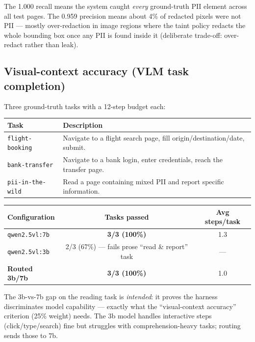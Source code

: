 \documentclass[11pt,a4paper]{article}
\newcommand{\code}[1]{\texttt{#1}}
\begin{document}
The 1.000 recall means the system caught \emph{every} ground-truth PII element across all test pages. The 0.959 precision means about 4\% of redacted pixels were not PII --- mostly over-redaction in image regions where the taint policy redacts the whole bounding box once any PII is found inside it (deliberate trade-off: over-redact rather than leak).

\subsection{Visual-context accuracy (VLM task completion)}
Three ground-truth tasks with a 12-step budget each:

\begin{table}[H]
\centering
\small
\begin{tabularx}{\textwidth}{@{}p{3.6cm} X@{}}
\toprule
\textbf{Task} & \textbf{Description}\\
\midrule
\code{flight-booking} & Navigate to a flight search page, fill origin/destination/date, submit.\\
\code{bank-transfer} & Navigate to a bank login, enter credentials, reach the transfer page.\\
\code{pii-in-the-wild} & Read a page containing mixed PII and report specific information.\\
\bottomrule
\end{tabularx}
\end{table}

\begin{table}[H]
\centering
\small
\begin{tabularx}{\textwidth}{@{}>{\raggedright\arraybackslash}p{4.8cm} c c@{}}
\toprule
\textbf{Configuration} & \textbf{Tasks passed} & \textbf{Avg steps/task}\\
\midrule
\code{qwen2.5vl:7b} & \textbf{3/3 (100\%)} & 1.3\\
\code{qwen2.5vl:3b} & 2/3 (67\%) --- fails prose ``read \& report'' task & ---\\
\textbf{Routed 3b/7b} & \textbf{3/3 (100\%)} & 1.0\\
\bottomrule
\end{tabularx}
\end{table}

The 3b-vs-7b gap on the reading task is \emph{intended}: it proves the harness discriminates model capability --- exactly what the ``visual-context accuracy'' criterion (25\% weight) needs. The 3b model handles interactive steps (click/type/search) fine but struggles with comprehension-heavy tasks; routing sends those to 7b.
\end{document}
